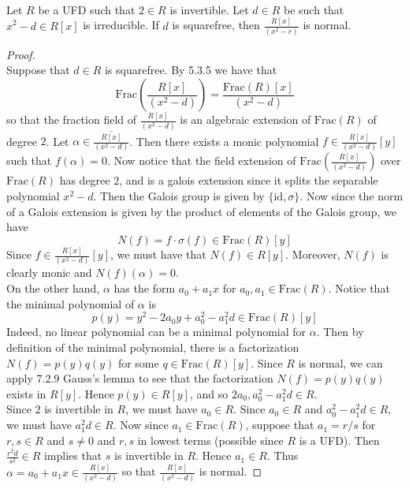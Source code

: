 \documentclass[a4paper]{article}
\begin{document}
\begin{eg}{}{}\\
Let $R$ be a UFD such that $2\in R$ is invertible. Let $d\in R$ be such that $x^2-d\in R[x]$ is irreducible. If $d$ is squarefree, then $\frac{R[x]}{(x^2-r)}$ is normal. 
\begin{proof}\\
Suppose that $d\in R$ is squarefree. By 5.3.5 we have that $$\text{Frac}\left(\frac{R[x]}{(x^2-d)}\right)=\frac{\text{Frac}(R)[x]}{(x^2-d)}$$ so that the fraction field of $\frac{R[x]}{(x^2-d)}$ is an algebraic extension of $\text{Frac}(R)$ of degree $2$. Let $\alpha\in\overline{\frac{R[x]}{(x^2-d)}}$. Then there exists a monic polynomial $f\in\frac{R[x]}{(x^2-d)}[y]$ such that $f(\alpha)=0$. Now notice that the field extension of $\text{Frac}\left(\frac{R[x]}{(x^2-d)}\right)$ over $\text{Frac}(R)$ has degree $2$, and is a galois extension since it splits the separable polynomial $x^2-d$. Then the Galois group is given by $\{\text{id},\sigma\}$. Now since the norm of a Galois extension is given by the product of elements of the Galois group, we have $$N(f)=f\cdot\sigma(f)\in\text{Frac}(R)[y]$$ Since $f\in\frac{R[x]}{(x^2-d)}[y]$, we must have that $N(f)\in R[y]$. Moreover, $N(f)$ is clearly monic and $N(f)(\alpha)=0$. \\

On the other hand, $\alpha$ has the form $a_0+a_1x$ for $a_0,a_1\in\text{Frac}(R)$. Notice that the minimal polynomial of $\alpha$ is $$p(y)=y^2-2a_0y+a_0^2-a_1^2d\in\text{Frac}(R)[y]$$ Indeed, no linear polynomial can be a minimal polynomial for $\alpha$. Then by definition of the minimal polynomial, there is a factorization $N(f)=p(y)q(y)$ for some $q\in\text{Frac}(R)[y]$. Since $R$ is normal, we can apply 7.2.9 Gauss's lemma to see that the factorization $N(f)=p(y)q(y)$ exists in $R[y]$. Hence $p(y)\in R[y]$, and so $2a_0,a_0^2-a_1^2d\in R$. \\

Since $2$ is invertible in $R$, we must have $a_0\in R$. Since $a_0\in R$ and $a_0^2-a_1^2d\in R$, we must have $a_1^2d\in R$. Now since $a_1\in\text{Frac}(R)$, suppose that $a_1=r/s$ for $r,s\in R$ and $s\neq 0$ and $r,s$ in lowest terms (possible since $R$ is a UFD). Then $\frac{r^2d}{s^2}\in R$ implies that $s$ is invertible in $R$. Hence $a_1\in R$. Thus $\alpha=a_0+a_1x\in\frac{R[x]}{(x^2-d)}$ so that $\frac{R[x]}{(x^2-d)}$ is normal. 
\end{proof}
\end{eg}
\end{document}
